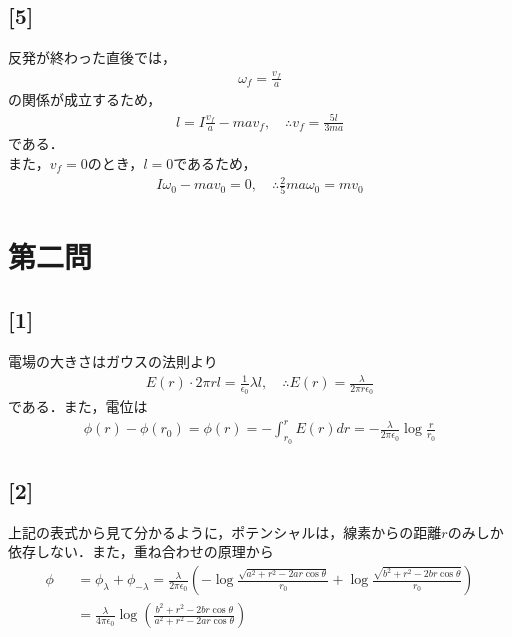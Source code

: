 \documentclass[12pt,dvipdfmx]{jsarticle}
\begin{document}
\subsection*{\large{[5]}}
反発が終わった直後では，
\begin{eqnarray}
  \omega_f = \frac{v_f}{a}
\end{eqnarray}
の関係が成立するため，
\begin{eqnarray}
  l = I \frac{v_f}{a} - ma v_f , \quad\therefore v_f = \frac{5l}{3ma}
\end{eqnarray}
である．\\
また，$v_f=0$のとき，$l=0$であるため，
\begin{eqnarray}
  I\omega_0 -mav_0=0,\quad\therefore \frac{2}{5}ma\omega_0 = mv_0
\end{eqnarray}
\newpage
\section*{\Large{第二問}}
\subsection*{\large{[1]}}
電場の大きさはガウスの法則より
\begin{eqnarray}
  E(r)\cdot 2\pi r l = \frac{1}{\epsilon_0}\lambda l,\quad\therefore E(r) = \frac{\lambda}{2\pi r \epsilon_0}
\end{eqnarray}
である．また，電位は
\begin{eqnarray}
  \phi(r)-\phi(r_0) = \phi(r) = -\int_{r_0}^{r} E(r) dr = -\frac{\lambda}{2\pi\epsilon_0}\log\frac{r}{r_0}
\end{eqnarray}
\subsection*{\large{[2]}}
上記の表式から見て分かるように，ポテンシャルは，線素からの距離$r$のみしか依存しない．また，重ね合わせの原理から
\begin{eqnarray}
  \phi&&= \phi_{\lambda} + \phi_{-\lambda} = \frac{\lambda}{2\pi\epsilon_0}\left( -\log \frac{\sqrt{a^2+r^2-2ar\cos\theta}}{r_0}+\log \frac{\sqrt{b^2+r^2-2br\cos\theta}}{r_0} \right)\\
  &&= \frac{\lambda}{4\pi\epsilon_0}\log\left( \frac{b^2 + r^2 -2br\cos\theta}{a^2 + r^2 -2ar\cos\theta} \right)
\end{eqnarray}
\end{document}
